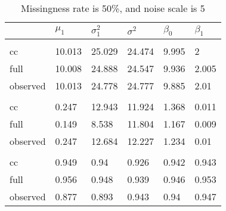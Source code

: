 \documentclass[
  twocolumn]{article}
\begin{document}
\begin{table}[h]
\caption{Missingness rate is 50\%, and noise scale is 5}
\begingroup\fontsize{7}{9}\selectfont

\begin{tabu} to 
\toprule
 & $\mu_1$ & $\sigma^2_1$ & $\sigma^2$ & $\beta_0$ & $\beta_1$\\
\midrule
\addlinespace[0.3em]
\\
\hspace{1em}cc & 10.013 & 25.029 & 24.474 & 9.995 & 2\\
\hspace{1em}full & 10.008 & 24.888 & 24.547 & 9.936 & 2.005\\
\hspace{1em}observed & 10.013 & 24.778 & 24.777 & 9.885 & 2.01\\
\addlinespace[0.3em]
\\
\hspace{1em}cc & 0.247 & 12.943 & 11.924 & 1.368 & 0.011\\
\hspace{1em}full & 0.149 & 8.538 & 11.804 & 1.167 & 0.009\\
\hspace{1em}observed & 0.247 & 12.684 & 12.227 & 1.234 & 0.01\\
\addlinespace[0.3em]
\\
\hspace{1em}cc & 0.949 & 0.94 & 0.926 & 0.942 & 0.943\\
\hspace{1em}full & 0.956 & 0.948 & 0.939 & 0.946 & 0.953\\
\hspace{1em}observed & 0.877 & 0.893 & 0.943 & 0.94 & 0.947\\
\bottomrule
\end{tabu}
\endgroup{}
\end{table}
\end{document}
